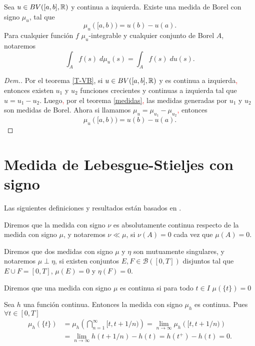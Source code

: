 \begin{thm} \label{Thm:medidas}
    	Sea $u\in BV([a,b],\mathbb{R})$ y continua a izquierda. Existe una medida de Borel con signo $\mu_{u}$, tal que $$\mu_{u}([a,b))=u(b)-u(a).$$  Para cualquier función $f$ $\mu_{u}$-integrable  y cualquier conjunto de Borel $A$, notaremos
	$$\int_{A}f(s)\;d\mu_{u}(s)=\int_{A}f(s)\;du(s).$$  
\end{thm}





\begin{proof}[Dem.]
Por el teorema \ref{T-VB}, si $u\in BV([a,b],\mathbb{R})$ y es continua a izquierda\textcolor{red}{,} entonces existen $u_1$ y $u_2$ funciones crecientes y continuas a izquierda tal que $u=u_1-u_2$. Luego\textcolor{red}{,} por el teorema \ref{medidas}\textcolor{red}{,}  las medidas generadas por $u_1$ y $u_2$ son medidas de Borel. Ahora si llamamos  $\mu_u=\mu_{u_1}-\mu_{u_2}$\textcolor{red}{,}   entonces
$$\mu_{u}([a,b))=u(b)-u(a).$$
\end{proof}


\section{Medida de Lebesgue-Stieljes con signo}

Las siguientes definiciones y resultados están basados en \cite[Capitulo 3]{folland}.

\begin{defi}
	Diremos que la medida con signo $\nu$ es absolutamente continua  respecto de la medida con signo $\mu$, y  notaremos $\nu\ll\mu$\index[Simbolo]{$\ll$}, si $\nu(A)=0$ cada vez que  $\mu(A)=0$.
\end{defi}


\begin{defi}
	Diremos que dos medidas con signo $\mu$ y $\eta$ son mutuamente singulares, y  notaremos $\mu\perp \eta$,  si existen conjuntos $E,F\in\mathscr{B}([0,T])$ disjuntos tal que $E\cup F=[0,T]$, $\mu(E)=0$ y $\eta(F)=0$. \index[Simbolo]{$\perp$}
\end{defi}

\begin{defi}
	Diremos que una medida con signo $\mu$ es continua  si para todo $t\in I$ $\mu(\{t\})=0$
\end{defi}
\begin{obs}\label{obs:medida continua}
	Sea $h$ una  función continua. Entonces la medida con signo $\mu_{h}$ es continua. Pues $\forall t\in[0,T]$
 \begin{equation*}
	\begin{split}
		\mu_{h}(\{t\})&= \mu_{h}\left( \bigcap_{n=1}^{\infty}[t,t+1/n)\right)=\lim_{n\to \infty}\mu_{h}\left( [t,t+1/n)\right)\\&=\lim_{n\to \infty}h(t+1/n)-h(t)=h(t^+)-h(t)=0.
	\end{split}
 \end{equation*}
\end{obs}

